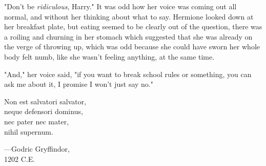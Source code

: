 "Don't be \emph{ridiculous}, Harry." It was odd how her voice was coming out
all normal, and without her thinking about what to say. Hermione looked down at
her breakfast plate, but eating seemed to be clearly out of the question, there
was a roiling and churning in her stomach which suggested that she was already
on the verge of throwing up, which was odd because she could have sworn her
whole body felt numb, like she wasn't feeling anything, at the same time.

"And," her voice said, "if you want to break school rules or something, you can
ask me about it, I promise I won't just say no."
\sbreak

\vspace*{-\baselineskip}
\begin{center}
Non est salvatori salvator,\\
neque defensori dominus,\\
nec pater nec mater,\\
nihil supernum.

---Godric Gryffindor,\\
1202 C.E.
\end{center}
